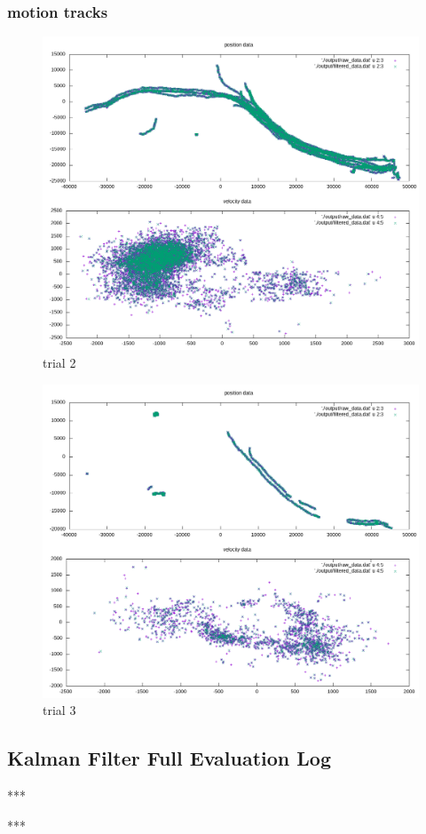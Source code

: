 \documentclass[10pt,a4paper]{article}
\begin{document}
\subsubsection{motion tracks}
\begin{figure}[H]
\caption{trial 2} 
\includegraphics[width=\textwidth]{../graphs/raw_data_2.png}
\end{figure}
\begin{figure}[H]
\caption{trial 3} 
\includegraphics[width=\textwidth]{../graphs/raw_data_3.png}
\end{figure}

\subsection{Kalman Filter Full Evaluation Log}


\begin{center}
***
\end{center}

\begin{center}
***
\end{center}

\end{document}
